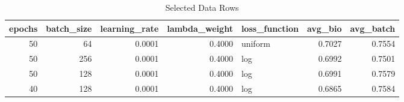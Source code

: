 \begin{table}[ht]
\caption{Selected Data Rows}
\label{tab:selected_rows}
\begin{tabular}{rrrrlrr}
\toprule
epochs & batch_size & learning_rate & lambda_weight & loss_function & avg_bio & avg_batch \\
\midrule
50 & 64 & 0.0001 & 0.4000 & uniform & 0.7027 & 0.7554 \\
50 & 256 & 0.0001 & 0.4000 & log & 0.6992 & 0.7501 \\
50 & 128 & 0.0001 & 0.4000 & log & 0.6991 & 0.7579 \\
40 & 128 & 0.0001 & 0.4000 & log & 0.6865 & 0.7584 \\
\bottomrule
\end{tabular}
\end{table}
